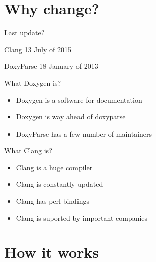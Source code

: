 \section{Why change?} %
\label{sec:why_change_}

\begin{frame}{Last update?}
\begin{Parallel}[v]{5cm}{5cm}
    \ParallelLText%
    {

        {\ttfamily Clang}  13 July of 2015
    }
    \ParallelRText%
    {
        {\ttfamily DoxyParse} 18 January of 2013
	}
\end{Parallel}
\end{frame}

\begin{frame}{What Doxygen is?}
   \begin{itemize} 
        \item Doxygen is a software for documentation
        \item Doxygen is way ahead of doxyparse
        \item DoxyParse has a few number of maintainers
    \end{itemize} 
\end{frame}

\begin{frame}{What Clang is?}
   \begin{itemize} 
        \item Clang is a huge compiler  
        \item Clang is constantly updated
        \item Clang has perl bindings
        \item Clang is suported by important companies
    \end{itemize}
\end{frame}


\section{How it works} %
\label{sec:how_it_works}

